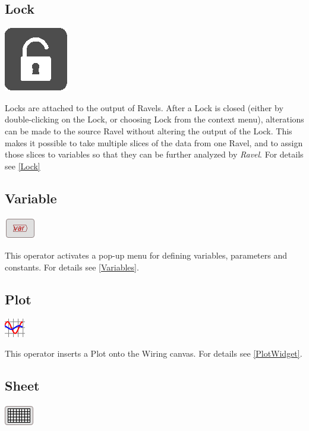 \subsection{Lock}

\includegraphics{images/Lock}

Locks are attached to the output of Ravels. After a Lock is closed
(either by double-clicking on the Lock, or choosing Lock from the
context menu), alterations can be made to the source Ravel without
altering the output of the Lock. This makes it possible to take multiple
slices of the data from one Ravel, and to assign those slices to variables
so that they can be further analyzed by \emph{Ravel}. For details
see \ref{Lock}

\subsection{Variable}

\includegraphics{images/var}

This operator activates a pop-up menu for defining variables, parameters
and constants. For details see \ref{Variables}.

\subsection{Plot}

\includegraphics{images/plot}

This operator inserts a Plot onto the Wiring canvas. For details see
\ref{PlotWidget}.

\subsection{Sheet}

\includegraphics{images/sheet}

